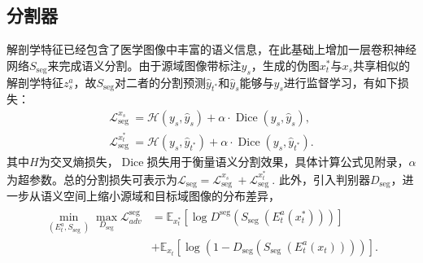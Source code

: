 \subsection{分割器}
解剖学特征已经包含了医学图像中丰富的语义信息，在此基础上增加一层卷积神经网络$S_{\mathrm{seg}}$来完成语义分割。由于源域图像带标注$y_s$，生成的伪图$x_t^*$与$x_s$共享相似的解剖学特征$z_s^a$，故$S_{\mathrm{seg}}$对二者的分割预测$\hat{y}_{t^*}$和$\hat{y}_s$能够与$y_s$进行监督学习，有如下损失：
\begin{align}
    \mathcal{L}_{\text {seg }}^{x_s}=\mathcal{H}\left(y_{s}, \hat{y}_{s}\right)+\alpha \cdot \operatorname{Dice}\left(y_{s}, \hat{y}_{s}\right),\\
    \mathcal{L}_{\text {seg }}^{x_t^*}=\mathcal{H}\left(y_{s}, \hat{y}_{t^*}\right)+\alpha \cdot \operatorname{Dice}\left(y_{s}, \hat{y}_{t^*}\right).
\end{align}
其中$H$为交叉熵损失，$\operatorname{Dice}$损失用于衡量语义分割效果，具体计算公式见附录，$\alpha$为超参数。总的分割损失可表示为$\mathcal{L}_{\mathrm{seg}} = \mathcal{L}_{\text {seg }}^{x_s} + \mathcal{L}_{\text {seg }}^{x_t^*}.$
此外，引入判别器$D_{\mathrm{seg}}$，进一步从语义空间上缩小源域和目标域图像的分布差异，
\begin{align}
    \begin{aligned}\min _{\left(E_{t}^a, S_{\text {seg }}\right)} \max _{D_{\mathrm{seg}}} \mathcal{L}_{a d v}^{\operatorname{seg}}&=\mathbb{E}_{x_{t}^{*}}\left[\log D^{\mathrm{seg }}\left(S_{\text {seg }}\left(E_{t}^a\left(x_{t}^{*}\right)\right)\right)\right] \\&+\mathbb{E}_{x_{t} }\left[\log \left(1-D_{\mathrm{seg}}\left(S_{\text {seg }}\left(E_{t}^a\left(x_{t}\right)\right)\right)\right)\right] .\end{aligned}
\end{align}

